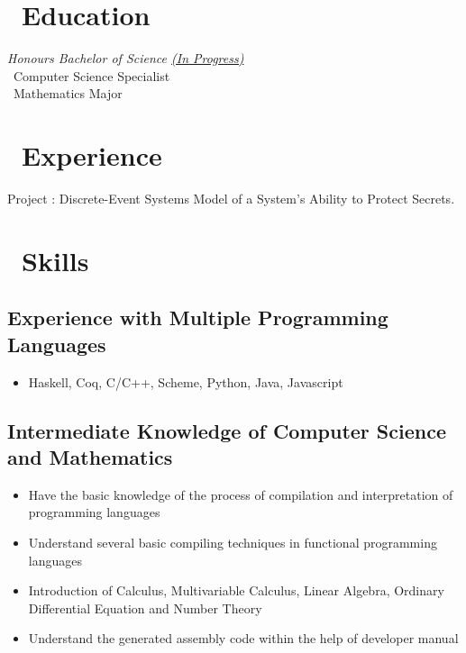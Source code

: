 \documentclass{resume}
\begin{document}



\section{\faGraduationCap\ Education}
\textit{Honours Bachelor of Science \underline{(In Progress)}} 
\\ \textperiodcentered\  Computer Science Specialist 
\\ \textperiodcentered\  Mathematics Major

\section{\faUsers\ Experience}
 {}
Project : Discrete-Event Systems Model of a System's Ability to Protect Secrets.





\section{\faCogs\ Skills}
\subsection{\textbf{Experience with Multiple Programming Languages}}
\begin{itemize}
 \item Haskell, Coq, C/C++, Scheme, Python, Java, Javascript
\end{itemize}
\subsection{\textbf{Intermediate Knowledge of Computer Science and Mathematics}}
\begin{itemize}
\item Have the basic knowledge of the process of compilation and interpretation of programming languages
\item Understand several basic compiling techniques in functional programming languages
\item Introduction of Calculus, Multivariable Calculus, Linear Algebra, Ordinary Differential Equation and Number Theory
\item Understand the generated assembly code within the help of developer manual
\end{itemize}
\end{document}
